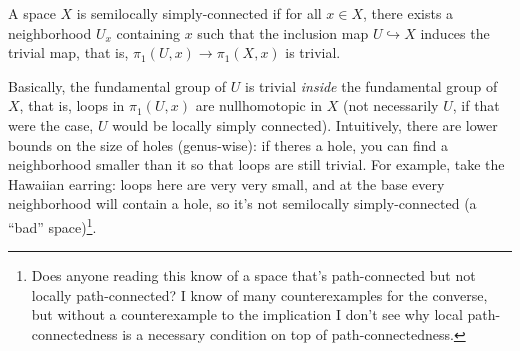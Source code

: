 \begin{definition}
    A space $X$ is semilocally simply-connected if for all $x\in X$, there exists a neighborhood $U_x$ containing $x$ such that the inclusion map $U \hookrightarrow X$ induces the trivial map, that is, $\pi_1(U,x)\to \pi_1(X,x)$ is trivial.
\end{definition}
Basically, the fundamental group of $U$ is trivial \emph{inside} the fundamental group of $X$, that is, loops in $\pi_1(U,x)$ are nullhomotopic in $X$ (not necessarily $U$, if that were the case, $U$ would be locally simply connected). Intuitively, there are lower bounds on the size of holes (genus-wise): if theres a hole, you can find a neighborhood smaller than it so that loops are still trivial. For example, take the Hawaiian earring: loops here are very very small, and at the base every neighborhood will contain a hole, so it's not semilocally simply-connected (a ``bad'' space)\footnote{Does anyone reading this know of a space that's path-connected but not locally path-connected? I know of many counterexamples for the converse, but without a counterexample to the implication I don't see why local path-connectedness is a necessary condition on top of path-connectedness.}.

